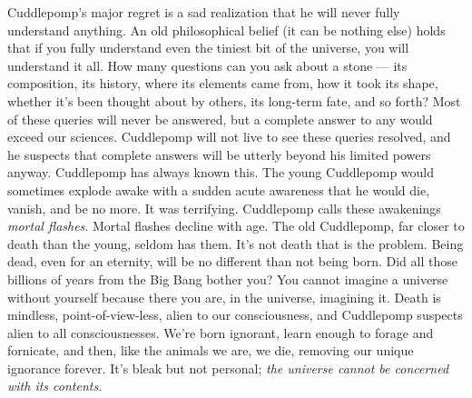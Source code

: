 Cuddlepomp's major regret is a sad realization that he will never fully
understand anything. An old philosophical belief (it can be nothing
else) holds that if you fully understand even the tiniest bit of the
universe, you will understand it all. How many questions can you ask
about a stone --- its composition, its history, where its elements came
from, how it took its shape, whether it's been thought about by others,
its long-term fate, and so forth? Most of these queries will never be
answered, but a complete answer to any would exceed our sciences.
Cuddlepomp will not live to see these queries resolved, and he suspects
that complete answers will be utterly beyond his limited powers anyway.
Cuddlepomp has always known this. The young Cuddlepomp would sometimes
explode awake with a sudden acute awareness that he would die, vanish,
and be no more. It was terrifying. Cuddlepomp calls these awakenings
\emph{mortal flashes}. Mortal flashes decline with age. The old
Cuddlepomp, far closer to death than the young, seldom has them. It's
not death that is the problem. Being dead, even for an eternity, will be
no different than not being born. Did all those billions of years from
the Big Bang bother you? You cannot imagine a universe without yourself
because there you are, in the universe, imagining it. Death is mindless,
point-of-view-less, alien to our consciousness, and Cuddlepomp suspects
alien to all consciousnesses. We're born ignorant, learn enough to
forage and fornicate, and then, like the animals we are, we die,
removing our unique ignorance forever. It's bleak but not personal;
\emph{the universe cannot be concerned with its contents.}



%
 

